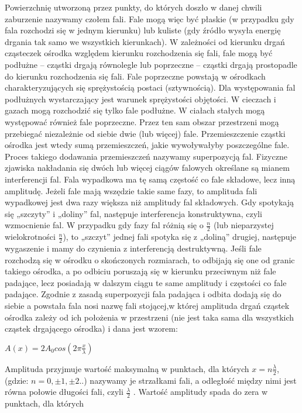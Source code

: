 \documentclass[12pt]{article}
\begin{document}
Powierzchnię utworzoną przez punkty, do których doszło w danej chwili zaburzenie nazywamy czołem fali. Fale mogą więc być płaskie (w przypadku gdy fala rozchodzi się w jednym kierunku) lub kuliste (gdy źródło wysyła energię drgania tak samo we wszystkich kierunkach). W zależności od kierunku drgań cząsteczek ośrodka względem kierunku rozchodzenia się fali, fale mogą być podłużne – cząstki drgają równolegle lub poprzeczne – cząstki drgają prostopadle do kierunku rozchodzenia się fali. Fale poprzeczne powstają w ośrodkach charakteryzujących się sprężystością postaci (sztywnością). Dla występowania fal podłużnych wystarczający jest warunek sprężystości objętości. W cieczach i gazach mogą rozchodzić się tylko fale podłużne. W ciałach stałych mogą występować również fale poprzeczne. \newline
Przez ten sam obszar przestrzeni mogą przebiegać niezależnie od siebie dwie (lub więcej) fale. Przemieszczenie cząstki ośrodka jest wtedy sumą przemieszczeń, jakie wywoływałyby poszczególne fale. Proces takiego dodawania przemieszczeń nazywamy superpozycją fal. Fizyczne zjawiska nakładania się dwóch lub więcej ciągów falowych określane są mianem interferencji fal. Fala wypadkowa ma tę samą częstość co fale składowe, lecz inną amplitudę. Jeżeli fale mają wszędzie takie same fazy, to amplituda fali wypadkowej jest dwa razy większa niż amplitudy fal składowych. Gdy spotykają się „szczyty” i „doliny” fal, następuje interferencja konstruktywna, czyli wzmocnienie fal. W przypadku gdy fazy fal różnią się o $\frac{n}{2}$ (lub nieparzystej wielokrotności $\frac{n}{2}$), to „szczyt” jednej fali spotyka się z „doliną” drugiej, następuje wygaszenie i mamy do czynienia z interferencją destruktywną. Jeśli fale rozchodzą się w ośrodku o skończonych rozmiarach, to odbijają się one od granic takiego ośrodka, a po odbiciu poruszają się w kierunku przeciwnym niż fale padające, lecz posiadają w dalszym ciągu te same amplitudy i częstości co fale padające. Zgodnie z zasadą superpozycji fala padająca i odbita dodają się do siebie a powstała fala nosi nazwę fali stojącej,\newline  w której amplituda drgań cząstek ośrodka zależy od ich położenia w przestrzeni (nie jest taka sama dla wszystkich cząstek drgającego ośrodka) i dana jest wzorem: 
\begin{center}
\Large $A(x)=2A_0cos(2\pi\frac{x}{\lambda})$
\end{center}
Amplituda przyjmuje wartość maksymalną w punktach, dla których $x=n\frac{\lambda}{2}$, (gdzie: $n = 0, \pm1, \pm2$..) nazywamy je strzałkami fali, a odległość między nimi jest równa połowie długości fali, czyli $\frac{\lambda}{2}$ . Wartość amplitudy spada do zera w punktach, dla których 
\end{document}
